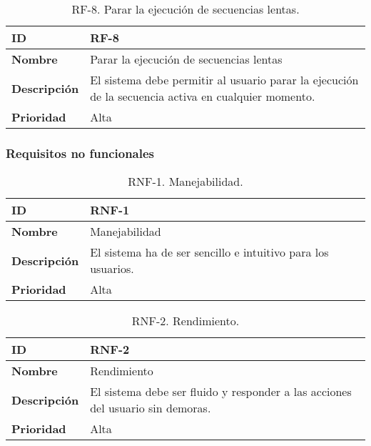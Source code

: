 \begin{table}[h!]
    \centering
    \begin{tabular}{|m{2.5cm}|m{9.27cm}|}
        \hline
        \textbf{ID} & RF-8 \\
        \hline
        \textbf{Nombre} & Parar la ejecución de secuencias lentas \\
        \hline
        \textbf{Descripción} & El sistema debe permitir al usuario parar la ejecución de la secuencia activa en cualquier momento. \\
        \hline
        \textbf{Prioridad} & Alta \\
        \hline
    \end{tabular}
    \caption{RF-8. Parar la ejecución de secuencias lentas.}
\end{table}

\FloatBarrier

\subsubsection{Requisitos no funcionales}

\begin{table}[h!]
    \centering
    \begin{tabular}{|m{2.5cm}|m{9.27cm}|}
        \hline
        \textbf{ID} & RNF-1 \\
        \hline
        \textbf{Nombre} & Manejabilidad \\
        \hline
        \textbf{Descripción} & El sistema ha de ser sencillo e intuitivo para los usuarios. \\
        \hline
        \textbf{Prioridad} & Alta \\
        \hline
    \end{tabular}
    \caption{RNF-1. Manejabilidad.}
    \label{tab:rnf2}
\end{table}

\begin{table}[h!]
    \centering
    \begin{tabular}{|m{2.5cm}|m{9.27cm}|}
        \hline
        \textbf{ID} & RNF-2 \\
        \hline
        \textbf{Nombre} & Rendimiento \\
        \hline
        \textbf{Descripción} & El sistema debe ser fluido y responder a las acciones del usuario sin demoras. \\
        \hline
        \textbf{Prioridad} & Alta \\
        \hline
    \end{tabular}
    \caption{RNF-2. Rendimiento.}
\end{table}

